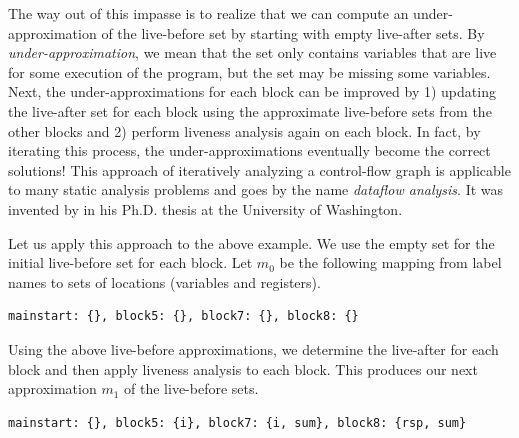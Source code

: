 \documentclass[7x10,nocrop]{TimesAPriori_MIT}%
\begin{document}
The way out of this impasse is to realize that we can compute an
under-approximation of the live-before set by starting with empty
live-after sets.  By \emph{under-approximation}, we mean that the set
only contains variables that are live for some execution of the
program, but the set may be missing some variables.  Next, the
under-approximations for each block can be improved by 1) updating the
live-after set for each block using the approximate live-before sets
from the other blocks and 2) perform liveness analysis again on each
block.  In fact, by iterating this process, the under-approximations
eventually become the correct solutions!
%
This approach of iteratively analyzing a control-flow graph is
applicable to many static analysis problems and goes by the name
\emph{dataflow analysis}.  It was invented by
\citet{Kildall:1973vn} in his Ph.D. thesis at the University of
Washington.

Let us apply this approach to the above example. We use the empty set
for the initial live-before set for each block. Let $m_0$ be the
following mapping from label names to sets of locations (variables and
registers).
\begin{center}
\begin{lstlisting}
mainstart: {}, block5: {}, block7: {}, block8: {}
\end{lstlisting}
\end{center}
Using the above live-before approximations, we determine the
live-after for each block and then apply liveness analysis to each
block.  This produces our next approximation $m_1$ of the live-before
sets.
\begin{center}
  \begin{lstlisting}
mainstart: {}, block5: {i}, block7: {i, sum}, block8: {rsp, sum}
\end{lstlisting}
\end{center}
\end{document}
